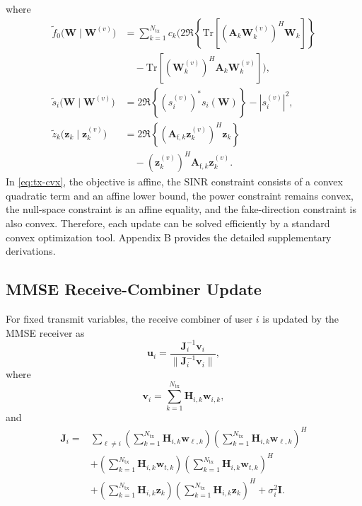 \documentclass[conference,twocolumn,a4paper]{IEEEtran}
\begin{document}
where
\begin{align}
\widetilde f_0\big(\mathbf{W}\mid\mathbf{W}^{(v)}\big)
&=\sum_{k=1}^{N_{\mathrm{tx}}}c_k\Big(2\Re\!\left\{\mathrm{Tr}\!\left[(\mathbf{A}_k\mathbf{W}_k^{(v)})^H\mathbf{W}_k\right]\right\} \nonumber\\
&\quad-\mathrm{Tr}\!\left[(\mathbf{W}_k^{(v)})^H\mathbf{A}_k\mathbf{W}_k^{(v)}\right]\Big),
\label{eq:ftilde}\\
\widetilde s_i\big(\mathbf{W}\mid\mathbf{W}^{(v)}\big)
&=2\Re\!\left\{\left(s_i^{(v)}\right)^*s_i(\mathbf{W})\right\}-|s_i^{(v)}|^2,
\label{eq:stilde}\\
\widetilde z_k\big(\mathbf{z}_k\mid\mathbf{z}_k^{(v)}\big)
&=2\Re\!\left\{\left(\mathbf{A}_{\mathrm{f},k}\mathbf{z}_k^{(v)}\right)^H\mathbf{z}_k\right\} \nonumber\\
&\quad-\left(\mathbf{z}_k^{(v)}\right)^H\mathbf{A}_{\mathrm{f},k}\mathbf{z}_k^{(v)}.
\label{eq:ztilde}
\end{align}
In \eqref{eq:tx-cvx}, the objective is affine, the SINR constraint consists of a convex quadratic term and an affine lower bound, the power constraint remains convex, the null-space constraint is an affine equality, and the fake-direction constraint is also convex. Therefore, each update can be solved efficiently by a standard convex optimization tool. Appendix B provides the detailed supplementary derivations.

\subsection{MMSE Receive-Combiner Update}
For fixed transmit variables, the receive combiner of user $i$ is updated by the MMSE receiver as
\begin{equation}
\mathbf{u}_i=\frac{\mathbf{J}_i^{-1}\mathbf{v}_i}{\|\mathbf{J}_i^{-1}\mathbf{v}_i\|},
\label{eq:mmse}
\end{equation}
where
\begin{equation}
\mathbf{v}_i=\sum_{k=1}^{N_{\mathrm{tx}}}\mathbf{H}_{i,k}\mathbf{w}_{i,k},
\end{equation}
and
\begin{align}
\mathbf{J}_i=&\sum_{\ell\neq i}\left(\sum_{k=1}^{N_{\mathrm{tx}}}\mathbf{H}_{i,k}\mathbf{w}_{\ell,k}\right)\left(\sum_{k=1}^{N_{\mathrm{tx}}}\mathbf{H}_{i,k}\mathbf{w}_{\ell,k}\right)^H \nonumber\\
&+\left(\sum_{k=1}^{N_{\mathrm{tx}}}\mathbf{H}_{i,k}\mathbf{w}_{t,k}\right)\left(\sum_{k=1}^{N_{\mathrm{tx}}}\mathbf{H}_{i,k}\mathbf{w}_{t,k}\right)^H \nonumber\\
&+\left(\sum_{k=1}^{N_{\mathrm{tx}}}\mathbf{H}_{i,k}\mathbf{z}_k\right)\left(\sum_{k=1}^{N_{\mathrm{tx}}}\mathbf{H}_{i,k}\mathbf{z}_k\right)^H+\sigma_i^2\mathbf{I}.
\label{eq:J}
\end{align}
\end{document}
